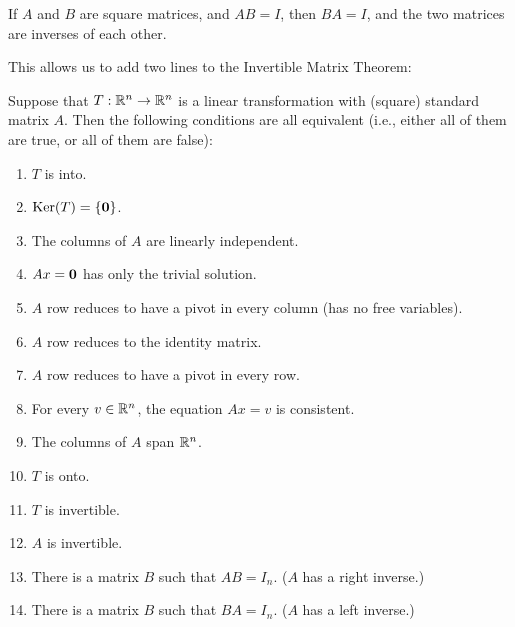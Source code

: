 \endedxproblem


\endedxvertical





{}  If  $A$ and $B$ are square matrices, and 
$AB = I$, then $BA = I$, and the two matrices are inverses of each other.  


This allows us to add two lines to the Invertible Matrix Theorem: 

{}  
Suppose that $T: \mathbb R^n \rightarrow \mathbb R^n$ is a linear transformation
with (square) standard matrix $A$.  Then the following conditions are all equivalent (i.e., either all of
them are true, or all of them are false):

\begin{enumerate}
\item $T$ is into.
\item $\mathrm{Ker}(T) = \{ \mathbf{0} \}$.  
\item The columns of $A$ are linearly independent. 
\item $Ax = \mathbf{0}$ has only the trivial solution.
\item $A$ row reduces to have a pivot in every column (has no free variables).  
\item $A$ row reduces to the identity matrix.  
\item $A$ row reduces to have a pivot in every row.  
\item For every $v\in \mathbb R^n$, the equation $Ax = v$ is consistent.
\item The columns of $A$ span $\mathbb R^n$.  
\item $T$ is onto.  
\item $T$ is invertible.
\item $A$ is invertible.
\item There is a matrix $B$ such that $AB = I_n$.  ($A$ has a right inverse.)
\item There is a matrix $B$ such that $BA = I_n$.  ($A$ has a left inverse.)  

\end{enumerate}



\endedxtext


\endedxvertical



